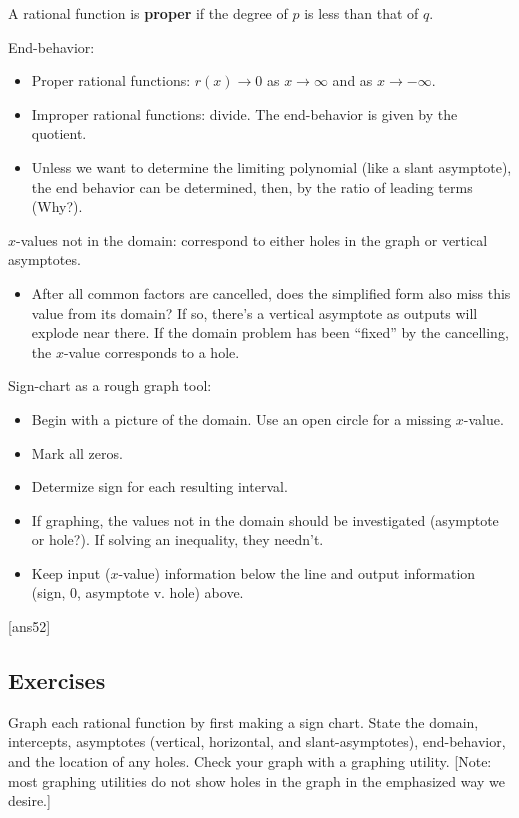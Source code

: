\documentclass{amsbook}
\numberwithin{section}{chapter}
\numberwithin{equation}{chapter}
\newcommand{\qi}[1]{\begin{itemize}\item #1 \end{itemize}}
\begin{document}
A rational function is \textbf{proper} if the degree of $p$ is less than that of $q$.

End-behavior:
\begin{itemize}
	\item Proper rational functions: $r(x) \to 0$ as $x \to \infty$ and as $x \to -\infty$.
	\item Improper rational functions: divide. The end-behavior is given by the quotient.
	\item Unless we want to determine the limiting polynomial (like a slant asymptote), the end behavior can be determined, then, by the ratio of leading terms (Why?).
\end{itemize}

$x$-values not in the domain: correspond to either holes in the graph or vertical asymptotes.
 \qi{After all common factors are cancelled, does the simplified form also miss this value from its domain? If so, there's a vertical asymptote as outputs will explode near there. If the domain problem has been ``fixed'' by the cancelling, the $x$-value corresponds to a hole.}
 
 Sign-chart as a rough graph tool:
 \begin{itemize}
 	\item Begin with a picture of the domain. Use an open circle for a missing $x$-value.
 	\item Mark all zeros.
 	\item Determize sign for each resulting interval.
 	\item If graphing, the values not in the domain should be investigated (asymptote or hole?). If solving an inequality, they needn't.
 	\item Keep input ($x$-value) information below the line and output information (sign, 0, asymptote v. hole) above.
 \end{itemize}


[ans52]
\subsection*{Exercises \nopunct} \hfill

Graph each rational function by first making a sign chart. State the domain, intercepts, asymptotes (vertical, horizontal, and slant-asymptotes), end-behavior, and the location of any holes. Check your graph with a graphing utility. [Note: most graphing utilities do not show holes in the graph in the emphasized way we desire.]
\end{document}
